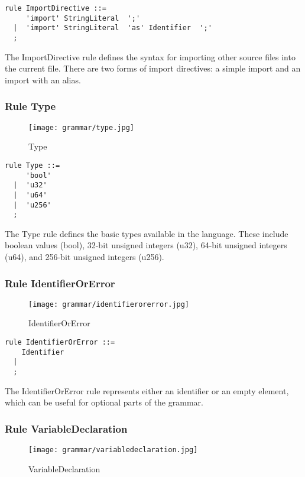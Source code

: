 \begin{lstlisting}
rule ImportDirective ::=
     'import' StringLiteral  ';' 
  |  'import' StringLiteral  'as' Identifier  ';' 
  ;
\end{lstlisting}

The ImportDirective rule defines the syntax for importing other source files into the current file. There are two forms of import directives: a simple import and an import with an alias.

\subsubsection*{Rule Type}

\begin{figure}[!ht]
\centering
\texttt{[image: grammar/type.jpg]}
\caption{Type}
\end{figure}

\begin{lstlisting}
rule Type ::=
     'bool' 
  |  'u32' 
  |  'u64' 
  |  'u256' 
  ;
\end{lstlisting}

The Type rule defines the basic types available in the language. These include boolean values (bool),  32-bit unsigned integers (u32), 64-bit unsigned integers (u64), and 256-bit unsigned integers (u256).

\subsubsection*{Rule IdentifierOrError}

\begin{figure}[!ht]
\centering
\texttt{[image: grammar/identifierorerror.jpg]}
\caption{IdentifierOrError}
\end{figure}

\begin{lstlisting}
rule IdentifierOrError ::=
    Identifier 
  | 
  ;
\end{lstlisting}

The IdentifierOrError rule represents either an identifier or an empty element, which can be useful for optional parts of the grammar.

\subsubsection*{Rule VariableDeclaration}

\begin{figure}[!ht]
\centering
\texttt{[image: grammar/variabledeclaration.jpg]}
\caption{VariableDeclaration}
\end{figure}

